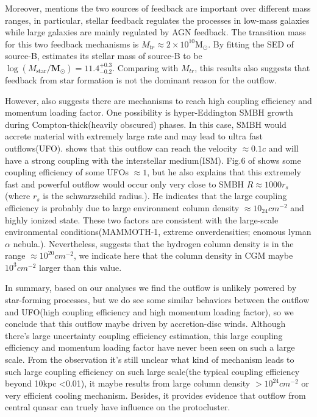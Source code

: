 \documentclass{subfiles}
\begin{document}
	 Moreover, \cite{shankar2006new} mentions the two sources of feedback are important over different mass ranges, in particular, stellar feedback regulates the processes in low-mass galaxies while large galaxies are mainly regulated by AGN feedback. The transition mass for this two feedback mechanisms is $M_{tr} \approx 2 \times 10^{10} \mathrm{M}_{\odot} $. By fitting the SED of source-B, \cite{arrigoni2018qso} estimates its stellar mass of source-B to be $\log \left(M_{\mathrm{star}} / \mathbf{M}_{\odot}\right)=11.4_{-0.2}^{+0.3}$. Comparing with $M_{tr}$, this results also suggests that feedback from star formation is not the dominant reason for the outflow.  
	 
	 However, \cite{zubovas2018agn} also suggests there are mechanisms to reach high coupling efficiency and momentum loading factor. One possibility is hyper-Eddington SMBH growth during Compton-thick(heavily obscured) phases. In this case, SMBH would accrete material with extremely large rate and may lead to ultra fast outflows(UFO).  \cite{tombesi2013unification} shows that this outflow can reach the velocity $\approx 0.1c$ and will have a strong coupling with the interstellar medium(ISM). Fig.6 of  \cite{tombesi2013unification} shows some coupling efficiency of some UFOs $\approx 1$, but he also explains that this extremely fast and powerful outflow would occur only very close to SMBH $R \approx 1000r_{s}$(where $r_{s}$ is the schwarzschild radius.).  He indicates that the large coupling efficiency is probably due to large environment column density $\approx 10_{24} cm^{-2}$ and highly ionized state. These two factors are consistent with the large-scale environmental conditions(MAMMOTH-1, extreme onverdensities; enomous lyman$\alpha$ nebula.). Nevertheless, \cite{cai2017discovery} suggests that the hydrogen column density is in the range $\approx 10^{20} cm^{-2}$, we indicate here that the column density in CGM maybe $10^{3} cm^{-2}$ larger than this value. 
	 
	 In summary, based on our analyses we find the outflow is unlikely powered by star-forming processes, but we do see some similar behaviors between the outflow and UFO(high coupling efficiency and high momentum loading factor), so we conclude that this outflow maybe driven by accretion-disc winds. Although there's large uncertainty coupling efficiency estimation, this large coupling efficiency and momentum loading factor have never been seen on such a large scale. From the observation it's still unclear what kind of mechanism leads to such large coupling efficiency on such large scale(the typical coupling efficiency beyond 10kpc <0.01), it maybe results from large column density $>10^{24}cm^{-2}$ or very efficient cooling mechanism. Besides, it provides evidence that outflow from central quasar can truely have influence on the protocluster.
\end{document}
